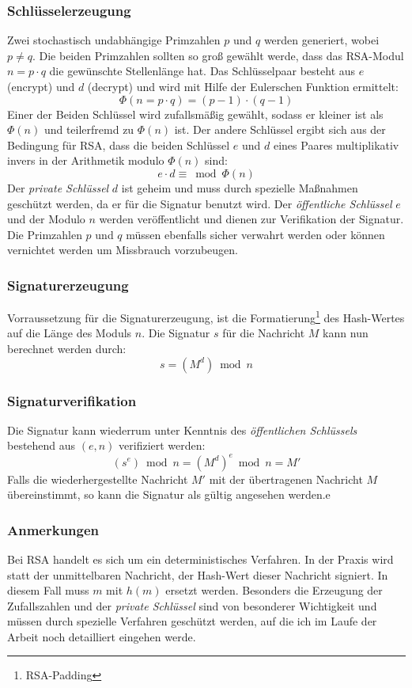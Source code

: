 \documentclass[11pt,a4paper,ngerman]{report}
\begin{document}
\subsubsection{Schlüsselerzeugung}
Zwei stochastisch undabhängige Primzahlen $p$ und $q$ werden generiert, wobei $p \neq q$. Die beiden Primzahlen sollten so groß gewählt werde, dass das RSA-Modul $n=p \cdot q$ die gewünschte Stellenlänge hat. Das Schlüsselpaar besteht aus $e$ (encrypt) und $d$ (decrypt) und wird mit Hilfe der Eulerschen Funktion ermittelt:
\[
    \Phi(n = p \cdot q) = (p-1) \cdot (q-1)
\]
Einer der Beiden Schlüssel wird zufallsmäßig gewählt, sodass er kleiner ist als $\Phi(n)$ und teilerfremd zu $\Phi(n)$ ist. Der andere Schlüssel ergibt sich aus der Bedingung für RSA, dass die beiden Schlüssel $e$ und $d$ eines Paares multiplikativ invers in der Arithmetik modulo $\Phi(n)$ sind:
\[
    e \cdot d \equiv \bmod \Phi(n) 
\]
Der \textit{private Schlüssel} $d$ ist geheim und muss durch spezielle Maßnahmen geschützt werden, da er für die Signatur benutzt wird. Der \textit{öffentliche Schlüssel} $e$ und der Modulo $n$ werden veröffentlicht und dienen zur Verifikation der Signatur. Die Primzahlen $p$ und $q$ müssen ebenfalls sicher verwahrt werden oder können vernichtet werden um Missbrauch vorzubeugen.
\subsubsection{Signaturerzeugung}
Vorraussetzung für die Signaturerzeugung, ist die Formatierung\footnote{RSA-Padding} des Hash-Wertes auf die Länge des Moduls $n$. Die Signatur $s$ für die Nachricht $M$ kann nun berechnet werden durch:
\[
    s = (M^d) \bmod n    
\]
\subsubsection{Signaturverifikation}
Die Signatur kann wiederrum unter Kenntnis des \textit{öffentlichen Schlüssels} bestehend aus $(e, n)$ verifiziert werden:
\[
    (s^e) \bmod n = (M^d)^e \bmod n = M'
\]
Falls die wiederhergestellte Nachricht $M'$ mit der übertragenen Nachricht $M$ übereinstimmt, so kann die Signatur als gültig angesehen werden.e
\subsubsection{Anmerkungen}
Bei RSA handelt es sich um ein deterministisches Verfahren. In der Praxis wird statt der unmittelbaren Nachricht, der Hash-Wert dieser Nachricht signiert. In diesem Fall muss $m$ mit $h(m)$ ersetzt werden. Besonders die Erzeugung der Zufallszahlen und der \textit{private Schlüssel} sind von besonderer Wichtigkeit und müssen durch spezielle Verfahren geschützt werden, auf die ich im Laufe der Arbeit  noch detailliert eingehen werde.
\end{document}
